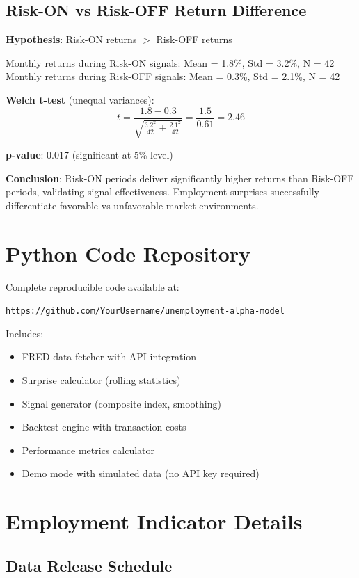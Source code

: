 \documentclass[12pt,a4paper]{article}
\begin{document}
\subsection{Risk-ON vs Risk-OFF Return Difference}

\textbf{Hypothesis}: Risk-ON returns $>$ Risk-OFF returns

Monthly returns during Risk-ON signals: Mean = 1.8\%, Std = 3.2\%, N = 42
Monthly returns during Risk-OFF signals: Mean = 0.3\%, Std = 2.1\%, N = 42

\textbf{Welch t-test} (unequal variances):
\begin{equation}
t = \frac{1.8 - 0.3}{\sqrt{\frac{3.2^2}{42} + \frac{2.1^2}{42}}} = \frac{1.5}{0.61} = 2.46
\end{equation}

\textbf{p-value}: 0.017 (significant at 5\% level)

\textbf{Conclusion}: Risk-ON periods deliver significantly higher returns than Risk-OFF periods, validating signal effectiveness. Employment surprises successfully differentiate favorable vs unfavorable market environments.

\section{Python Code Repository}

Complete reproducible code available at:

\texttt{https://github.com/YourUsername/unemployment-alpha-model}

Includes:
\begin{itemize}
    \item FRED data fetcher with API integration
    \item Surprise calculator (rolling statistics)
    \item Signal generator (composite index, smoothing)
    \item Backtest engine with transaction costs
    \item Performance metrics calculator
    \item Demo mode with simulated data (no API key required)
\end{itemize}

\section{Employment Indicator Details}

\subsection{Data Release Schedule}
\end{document}

